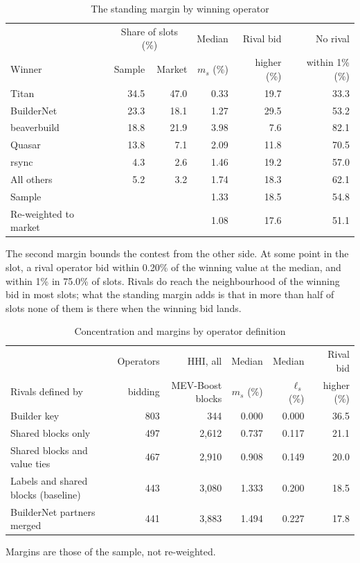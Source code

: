\documentclass[11pt]{article}
\begin{document}
\begin{table}[!htbp]
\centering
\caption{The standing margin by winning operator}
\label{tab:winner}
\begin{tabular}{lrrrrr}
\toprule
 & \multicolumn{2}{c}{Share of slots (\%)} & Median & Rival bid & No rival \\
Winner & Sample & Market & $m_s$ (\%) & higher (\%) & within 1\% (\%) \\
\midrule
Titan & 34.5 & 47.0 & 0.33 & 19.7 & 33.3 \\
BuilderNet & 23.3 & 18.1 & 1.27 & 29.5 & 53.2 \\
beaverbuild & 18.8 & 21.9 & 3.98 & 7.6 & 82.1 \\
Quasar & 13.8 & 7.1 & 2.09 & 11.8 & 70.5 \\
rsync & 4.3 & 2.6 & 1.46 & 19.2 & 57.0 \\
All others & 5.2 & 3.2 & 1.74 & 18.3 & 62.1 \\
\midrule
Sample & & & 1.33 & 18.5 & 54.8 \\
Re-weighted to market & & & 1.08 & 17.6 & 51.1 \\
\bottomrule
\end{tabular}
\end{table}

The second margin bounds the contest from the other side. At some point in
the slot, a rival operator bid within 0.20\% of the winning value at the
median, and within 1\% in 75.0\% of slots. Rivals do reach the neighbourhood
of the winning bid in most slots; what the standing margin adds is that in
more than half of slots none of them is there when the winning bid lands.

\begin{table}[!htbp]
\centering
\small
\caption{Concentration and margins by operator definition}
\label{tab:linking}
\begin{tabular}{lrrrrr}
\toprule
 & Operators & HHI, all & Median & Median & Rival bid \\
Rivals defined by & bidding & MEV-Boost blocks & $m_s$ (\%) & $\ell_s$ (\%) & higher (\%) \\
\midrule
Builder key & 803 & 344 & 0.000 & 0.000 & 36.5 \\
Shared blocks only & 497 & 2{,}612 & 0.737 & 0.117 & 21.1 \\
Shared blocks and value ties & 467 & 2{,}910 & 0.908 & 0.149 & 20.0 \\
Labels and shared blocks (baseline) & 443 & 3{,}080 & 1.333 & 0.200 & 18.5 \\
BuilderNet partners merged & 441 & 3{,}883 & 1.494 & 0.227 & 17.8 \\
\bottomrule
\end{tabular}

\vspace{0.5em}
\footnotesize Margins are those of the sample, not re-weighted.
\end{table}
\end{document}
